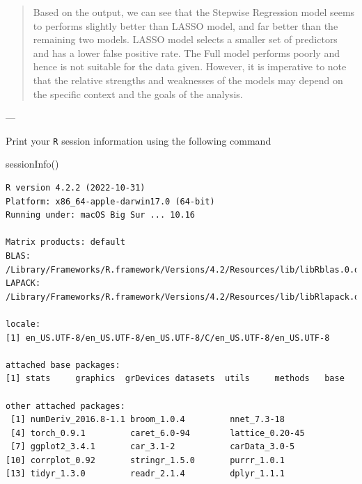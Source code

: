 \documentclass[
  letterpaper,
  DIV=11,
  numbers=noendperiod]{scrartcl}
\newenvironment{Shaded}{\begin{snugshade}}{\end{snugshade}}
\newcommand{\FunctionTok}[1]{\textcolor[rgb]{0.28,0.35,0.67}{#1}}
\newcommand{\NormalTok}[1]{\textcolor[rgb]{0.00,0.23,0.31}{#1}}
\begin{document}
\begin{quote}
Based on the output, we can see that the Stepwise Regression model seems
to performs slightly better than LASSO model, and far better than the
remaining two models. LASSO model selects a smaller set of predictors
and has a lower false positive rate. The Full model performs poorly and
hence is not suitable for the data given. However, it is imperative to
note that the relative strengths and weaknesses of the models may depend
on the specific context and the goals of the analysis.
\end{quote}

\pagebreak

---

\begin{tcolorbox}[enhanced jigsaw, breakable, colframe=quarto-callout-note-color-frame, bottomtitle=1mm, leftrule=.75mm, bottomrule=.15mm, arc=.35mm, titlerule=0mm, coltitle=black, colback=white, colbacktitle=quarto-callout-note-color!10!white, opacitybacktitle=0.6, toptitle=1mm, opacityback=0, title=\textcolor{quarto-callout-note-color}{\faInfo}\hspace{0.5em}{Session Information}, toprule=.15mm, left=2mm, rightrule=.15mm]

Print your \texttt{R} session information using the following command

\begin{Shaded}
\begin{Highlighting}[]
\FunctionTok{sessionInfo}\NormalTok{()}
\end{Highlighting}
\end{Shaded}

\begin{verbatim}
R version 4.2.2 (2022-10-31)
Platform: x86_64-apple-darwin17.0 (64-bit)
Running under: macOS Big Sur ... 10.16

Matrix products: default
BLAS:   /Library/Frameworks/R.framework/Versions/4.2/Resources/lib/libRblas.0.dylib
LAPACK: /Library/Frameworks/R.framework/Versions/4.2/Resources/lib/libRlapack.dylib

locale:
[1] en_US.UTF-8/en_US.UTF-8/en_US.UTF-8/C/en_US.UTF-8/en_US.UTF-8

attached base packages:
[1] stats     graphics  grDevices datasets  utils     methods   base     

other attached packages:
 [1] numDeriv_2016.8-1.1 broom_1.0.4         nnet_7.3-18        
 [4] torch_0.9.1         caret_6.0-94        lattice_0.20-45    
 [7] ggplot2_3.4.1       car_3.1-2           carData_3.0-5      
[10] corrplot_0.92       stringr_1.5.0       purrr_1.0.1        
[13] tidyr_1.3.0         readr_2.1.4         dplyr_1.1.1        


\end{verbatim}
\end{tcolorbox}
\end{document}
